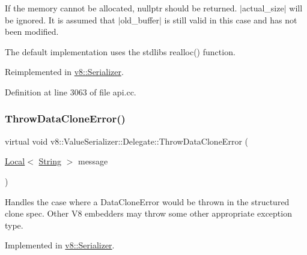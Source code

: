 If the memory cannot be allocated, nullptr should be returned. $\vert$actual\+\_\+size$\vert$ will be ignored. It is assumed that $\vert$old\+\_\+buffer$\vert$ is still valid in this case and has not been modified.

The default implementation uses the stdlib\textquotesingle{}s {\ttfamily realloc()} function. 

Reimplemented in \mbox{\hyperlink{classv8_1_1Serializer_a0642983ee43067669e17c87411167a02}{v8\+::\+Serializer}}.



Definition at line 3063 of file api.\+cc.

\mbox{\label{classv8_1_1ValueSerializer_1_1Delegate_a3681bfcd9a6c45f0b12bd7a8bdf34d85}} 
\subsubsection{\texorpdfstring{Throw\+Data\+Clone\+Error()}{ThrowDataCloneError()}}
{\footnotesize\ttfamily virtual void v8\+::\+Value\+Serializer\+::\+Delegate\+::\+Throw\+Data\+Clone\+Error (\begin{DoxyParamCaption}\item[{\mbox{\hyperlink{classv8_1_1Local}{Local}}$<$ \mbox{\hyperlink{classv8_1_1String}{String}} $>$}]{message }\end{DoxyParamCaption})\hspace{0.3cm}{\ttfamily [pure virtual]}}

Handles the case where a Data\+Clone\+Error would be thrown in the structured clone spec. Other V8 embedders may throw some other appropriate exception type. 

Implemented in \mbox{\hyperlink{classv8_1_1Serializer_a97707713e9bfe28e117bd15d40e3afc6}{v8\+::\+Serializer}}.

\mbox{\label{classv8_1_1ValueSerializer_1_1Delegate_a9cdf9bb45300507456548161cbe656b5}} 

